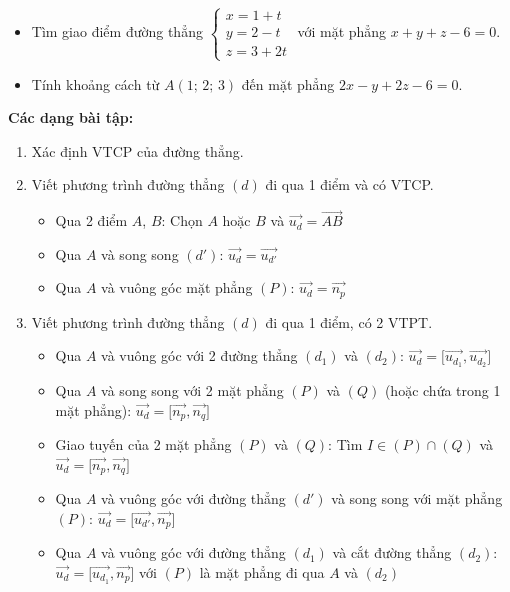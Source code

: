 \documentclass[12pt,a4paper]{article}
\begin{document}
\begin{vidu}
  \begin{itemize}
    \item Tìm giao điểm đường thẳng
      $\begin{cases} x = 1 + t \\ y = 2 - t \\ z = 3 + 2t \end{cases}$
      với mặt phẳng $x + y + z - 6 = 0$.
    \item Tính khoảng cách từ $A(1;\, 2;\, 3)$ đến mặt phẳng $2x - y + 2z - 6 = 0$.
  \end{itemize}
\end{vidu}

\medskip\noindent\textbf{Các dạng bài tập:}
\begin{enumerate}[label=\textbf{Dạng \arabic*:}, leftmargin=*, align=left]
  \item Xác định VTCP của đường thẳng.
  \item Viết phương trình đường thẳng $(d)$ đi qua 1 điểm và có VTCP.
  \begin{itemize}
      \item Qua 2 điểm $A$, $B$: Chọn $A$ hoặc $B$ và $\vec{u_d} = \overrightarrow{AB}$
      \item Qua $A$ và song song $(d')$: $\vec{u_d} = \vec{u_{d'}}$
      \item Qua $A$ và vuông góc mặt phẳng $(P)$: $\vec{u_d} = \vec{n_p}$
  \end{itemize}
  \item Viết phương trình đường thẳng $(d)$ đi qua 1 điểm, có 2 VTPT.
  \begin{itemize}
      \item Qua $A$ và vuông góc với 2 đường thẳng $(d_1)$ và $(d_2)$: $\vec{u_d} = \bigl[\vec{u_{d_1}}, \vec{u_{d_2}}\bigr]$
      \item Qua $A$ và song song với 2 mặt phẳng $(P)$ và $(Q)$ (hoặc chứa trong 1 mặt phẳng): $\vec{u_d} = \bigl[\vec{n_p}, \vec{n_q}\bigr]$
      \item Giao tuyến của 2 mặt phẳng $(P)$ và $(Q)$: Tìm $I \in (P) \cap (Q)$ và $\vec{u_d} = \bigl[\vec{n_p}, \vec{n_q}\bigr]$
      \item Qua $A$ và vuông góc với đường thẳng $(d')$ và song song với mặt phẳng $(P)$: $\vec{u_d} = \bigl[\vec{u_{d'}}, \vec{n_p}\bigr]$
      \item Qua $A$ và vuông góc với đường thẳng $(d_1)$ và cắt đường thẳng $(d_2)$: $\vec{u_d} = \bigl[\vec{u_{d_1}}, \vec{n_p}\bigr]$ với $(P)$ là mặt phẳng đi qua $A$ và $(d_2)$

\end{itemize}
\end{enumerate}
\end{document}
